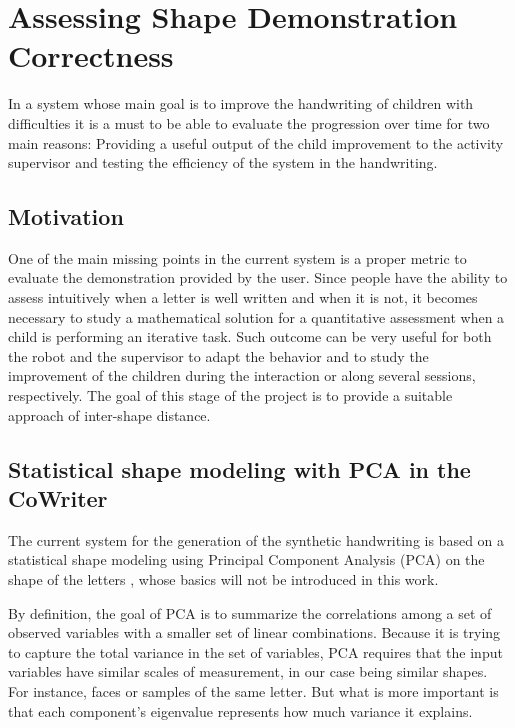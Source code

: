 \chapter{Assessing Shape Demonstration Correctness} \label{chap:correctness}
In a system whose main goal is to improve the handwriting of children with difficulties it is a must to be able to evaluate the progression over time for two main reasons: Providing a useful output of the child improvement to the activity supervisor and testing the efficiency of the system in the handwriting.  

\section{Motivation}
One of the main missing points in the current system is a proper metric to evaluate the demonstration provided by the user. Since people have the ability to assess intuitively when a letter is well written and when it is not, it becomes necessary to study a mathematical solution for a quantitative assessment when a child is performing an iterative task. Such outcome can be very useful for both the robot and the supervisor to adapt the behavior and to study the improvement of the children during the interaction or along several sessions, respectively. The goal of this stage of the project is to provide a suitable approach of inter-shape distance.
 
\section{Statistical shape modeling with PCA in the CoWriter}
The current system for the generation of the synthetic handwriting is based on a statistical shape modeling using Principal Component Analysis (PCA) \cite{stegmann2002brief} on the shape of the letters \cite{hood2015children}, whose basics will not be introduced in this work. 

By definition, the goal of PCA is to summarize the correlations among a set of observed variables with a smaller set of linear combinations. Because it is trying to capture the total variance in the set of variables, PCA requires that the input variables have similar scales of measurement, in our case being similar shapes. For instance, faces or samples of the same letter. But what is more important is that each component's eigenvalue represents how much variance it explains. 


